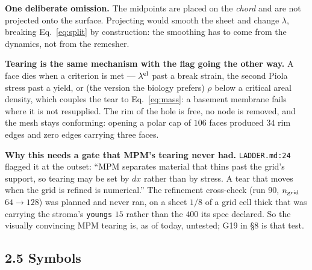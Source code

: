 \documentclass[10pt,a4paper]{article}
\newcommand{\code}[1]{\texttt{#1}}
\begin{document}
\textbf{One deliberate omission.} The midpoints are placed on the \emph{chord} and are not projected
onto the surface. Projecting would smooth the sheet and change $\lambda$, breaking Eq.~\eqref{eq:split}
by construction: the smoothing has to come from the dynamics, not from the remesher.

\textbf{Tearing is the same mechanism with the flag going the other way.} A face dies when a criterion
is met --- $\lambda^{\rm el}$ past a break strain, the second Piola stress past a yield, or (the version
the biology prefers) $\rho$ below a critical areal density, which couples the tear to
Eq.~\eqref{eq:mass}: a basement membrane fails where it is not resupplied. The rim of the hole is free,
no node is removed, and the mesh stays conforming: opening a polar cap of $106$ faces produced $34$ rim
edges and zero edges carrying three faces.

\textbf{Why this needs a gate that MPM's tearing never had.} \code{LADDER.md:24} flagged it at the
outset: ``MPM separates material that thins past the grid's support, so tearing may be set by $dx$
rather than by stress. A tear that moves when the grid is refined is numerical.'' The refinement
cross-check (run 90, $n_{\rm grid}$ $64\to128$) was planned and never ran, on a sheet $1/8$ of a grid
cell thick that was carrying the stroma's \code{youngs} $15$ rather than the $400$ its spec declared.
So the visually convincing MPM tearing is, as of today, untested; G19 in \S8 is that test.

\subsection*{2.5\; Symbols}
\end{document}
